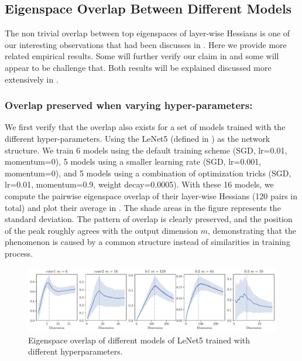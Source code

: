 \subsection{Eigenspace Overlap Between Different Models}
\label{sec:appendix_expres_ovlp}
The non trivial overlap between top eigenspaces of layer-wise Hessians is one of our interesting observations that had been discusses in . Here we provide more related empirical results. Some will further verify our claim in  and some will appear to be challenge that. Both results will be explained discussed more extensively in .

\subsubsection{Overlap preserved when varying hyper-parameters:}
We first verify that the overlap also exists for a set of models trained with the different hyper-parameters. Using the LeNet5 (defined in ) as the network structure. We train 6 models using the default training scheme (SGD, lr=0.01, momentum=0), 5 models using a smaller learning rate (SGD, lr=0.001, momentum=0), and 5 models using a combination of optimization tricks (SGD, lr=0.01, momentum=0.9, weight decay=0.0005).
With these 16 models, we compute the pairwise eigenspace overlap of their layer-wise Hessians (120 pairs in total) and plot their average in . The shade areas in the figure represents the standard deviation. The pattern of overlap is clearly preserved, and the position of the peak roughly agrees with the output dimension $m$, demonstrating that the phenomenon is caused by a common structure instead of similarities in training process.

\begin{figure}[H]
    \centering
    \includegraphics[width=\textwidth]{Appendix_Figures/Overlap_different_models/DimOverlap_CIFAR10_LeNet5_normnew_fixlr0.001_X_LeNet5_normnew_fixlr0.01_X_LeNet5_normnew_fixlr0.01_momentum_appendix_full.pdf}
    \vspace{-1em}
    \caption{Eigenspace overlap of different models of LeNet5 trained with different hyperparameters.}
    \vspace{-1em}
    \label{fig:app_overlap_different_hyperparam}
\end{figure}

